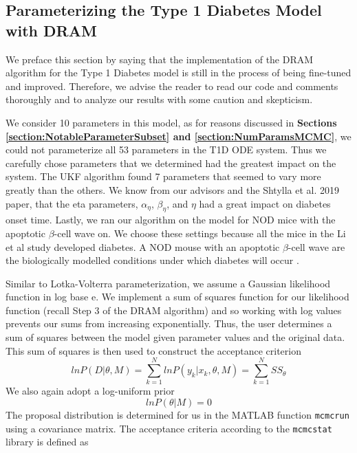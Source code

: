 \subsection{Parameterizing the Type 1 Diabetes Model with DRAM} \label{Parameterizing_T1D_DRAM}
We preface this section by saying that the implementation of the DRAM algorithm for the Type 1 Diabetes model is still in the process of being fine-tuned and improved. Therefore, we advise the reader to read our code and comments thoroughly and to analyze our results with some caution and skepticism.
\par We consider 10 parameters in this model, as for reasons discussed in \textbf{Sections \ref{section:NotableParameterSubset} and \ref{section:NumParamsMCMC}}, we could not parameterize all 53 parameters in the T1D ODE system. Thus we carefully chose parameters that we determined had the greatest impact on the system. The UKF algorithm found 7 parameters that seemed to vary more greatly than the others. We know from our advisors and the Shtylla et al. 2019 paper, that the eta parameters, $\alpha_{\eta}$, $\beta_{\eta}$, and $\eta$ had a great impact on diabetes onset time. Lastly, we ran our algorithm on the model for NOD mice with the apoptotic $\beta$-cell wave on. We choose these settings because all the mice in the Li et al study developed diabetes. A NOD mouse with an apoptotic $\beta$-cell wave are the biologically modelled conditions under which diabetes will occur \cite{shtylla2019mathematical}. 
\par Similar to Lotka-Volterra parameterization, we assume a Gaussian likelihood function in log base e. We implement a sum of squares function for our likelihood function (recall Step 3 of the DRAM algorithm) and so working with log values prevents our sums from increasing exponentially. Thus, the user determines a sum of squares between the model given parameter values and the original data. This sum of squares is then used to construct the acceptance criterion
\begin{equation} \label{eq:19mcmc}
lnP(D|\theta, M) = \sum_{k=1}^{N}lnP(y_k|x_k,\theta,M) = \sum_{k=1}^N SS_\theta 
\end{equation}
 We also again adopt a log-uniform prior
\begin{equation} \label{eq:20mcmc}
lnP(\theta|M) = 0
\end{equation}
The proposal distribution is determined for us in the MATLAB function \texttt{mcmcrun} using a covariance matrix. The acceptance criteria according to the \texttt{mcmcstat} library is defined as
